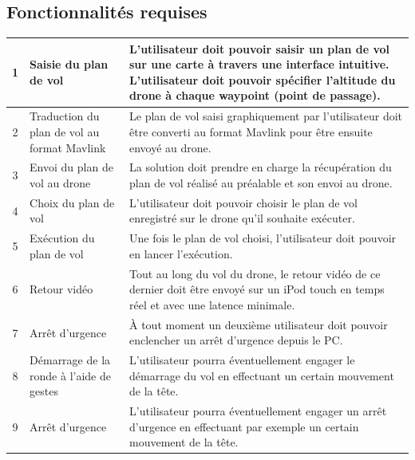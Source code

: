 \documentclass{article}
\begin{document}
    \subsection{Fonctionnalités requises}
	    \begin{center}
	    \vspace*{0.7cm}
        \begin{tabularx}{15cm}{|c|p{4cm}|X|}
            \hline
            1 & Saisie du plan de vol & L'utilisateur doit pouvoir saisir un plan de vol sur une carte à travers une interface intuitive. L'utilisateur doit pouvoir spécifier l'altitude du drone à chaque waypoint (point de passage).\\
            \hline
            2 & Traduction du plan de vol au format Mavlink & Le plan de vol saisi graphiquement par l'utilisateur doit être converti au format Mavlink pour être ensuite envoyé au drone.\\
            \hline
            3 & Envoi du plan de vol au drone & La solution doit prendre en charge la récupération du plan de vol réalisé au préalable et son envoi au drone. \\
            \hline
            4 & Choix du plan de vol  & L'utilisateur doit pouvoir choisir le plan de vol enregistré sur le drone qu'il souhaite exécuter. \\
            \hline
            5 & Exécution du plan de vol  & Une fois le plan de vol choisi, l'utilisateur doit pouvoir en lancer l'exécution. \\
            \hline
            6 & Retour vidéo  & Tout au long du vol du drone, le retour vidéo de ce dernier doit être envoyé sur un iPod touch en temps réel et avec une latence minimale. \\
            \hline
            7 & Arrêt d'urgence  & À tout moment un deuxième utilisateur doit pouvoir enclencher un arrêt d'urgence depuis le PC. \\
            \hline
            8 & Démarrage de la ronde à l'aide de gestes & L'utilisateur pourra éventuellement engager le démarrage du vol en effectuant un certain mouvement de la tête. 	\\
			\hline
			9 & Arrêt d'urgence & L'utilisateur pourra éventuellement engager un arrêt d'urgence en effectuant par exemple un certain mouvement de la tête. 	\\
			\hline
        \end{tabularx}
        \end{center}
        
\end{document}
